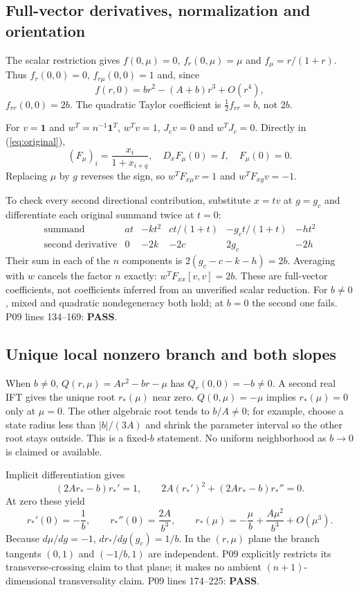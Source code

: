 \documentclass[11pt]{article}
\newcommand{\one}{\mathbf{1}}
\newcommand{\lin}[1]{P09 lines #1}
\newcommand{\pass}{\textbf{PASS}}
\begin{document}
\subsection{Full-vector derivatives, normalization and orientation}
The scalar restriction gives $f(0,\mu)=0$, $f_r(0,\mu)=\mu$ and
$f_\mu=r/(1+r)$. Thus $f_r(0,0)=0$, $f_{r\mu}(0,0)=1$ and, since
\[
 f(r,0)=br^2-(A+b)r^3+O(r^4),
\]
$f_{rr}(0,0)=2b$. The quadratic Taylor coefficient is
$\tfrac12 f_{rr}=b$, not $2b$.

For $v=\one$ and $w^T=n^{-1}\one^T$, $w^Tv=1$, $J_cv=0$ and
$w^TJ_c=0$. Directly in (\ref{eq:original}),
\[
 (F_\mu)_i=\frac{x_i}{1+x_{i+q}},\quad
 D_xF_\mu(0)=I,\quad F_\mu(0)=0.
\]
Replacing $\mu$ by $g$ reverses the sign, so
$w^TF_{x\mu}v=1$ and $w^TF_{xg}v=-1$.

To check every second directional contribution, substitute $x=tv$ at
$g=g_c$ and differentiate each original summand twice at $t=0$:
\[
\begin{array}{c|ccccc}
\text{summand}&at&-kt^2&ct/(1+t)&-g_ct/(1+t)&-ht^2\\\hline
\text{second derivative}&0&-2k&-2c&2g_c&-2h
\end{array}
\]
Their sum in each of the $n$ components is
$2(g_c-c-k-h)=2b$. Averaging with $w$ cancels the factor $n$ exactly:
$w^TF_{xx}[v,v]=2b$. These are full-vector coefficients, not coefficients
inferred from an unverified scalar reduction. For $b\ne0$, mixed and
quadratic nondegeneracy both hold; at $b=0$ the second one fails.
\lin{134--169}: \pass.

\subsection{Unique local nonzero branch and both slopes}
When $b\ne0$, $Q(r,\mu)=Ar^2-br-\mu$ has $Q_r(0,0)=-b\ne0$.
A second real IFT gives the unique root $r_*(\mu)$ near zero.
$Q(0,\mu)=-\mu$ implies $r_*(\mu)=0$ only at $\mu=0$.
The other algebraic root tends to $b/A\ne0$; for example, choose a state
radius less than $|b|/(3A)$ and shrink the parameter interval so the other
root stays outside. This is a fixed-$b$ statement. No uniform neighborhood
as $b\to0$ is claimed or available.

Implicit differentiation gives
\[
 (2Ar_*-b)r_*'=1,\qquad
 2A(r_*')^2+(2Ar_*-b)r_*''=0.
\]
At zero these yield
\[
 r_*'(0)=-\frac1b,\qquad r_*''(0)=\frac{2A}{b^3},\qquad
 r_*(\mu)=-\frac\mu b+\frac{A\mu^2}{b^3}+O(\mu^3).
\]
Because $d\mu/dg=-1$, $dr_*/dg(g_c)=1/b$. In the $(r,\mu)$ plane
the branch tangents $(0,1)$ and $(-1/b,1)$ are independent. P09 explicitly
restricts its transverse-crossing claim to that plane; it makes no
ambient $(n+1)$-dimensional transversality claim. \lin{174--225}: \pass.
\end{document}
